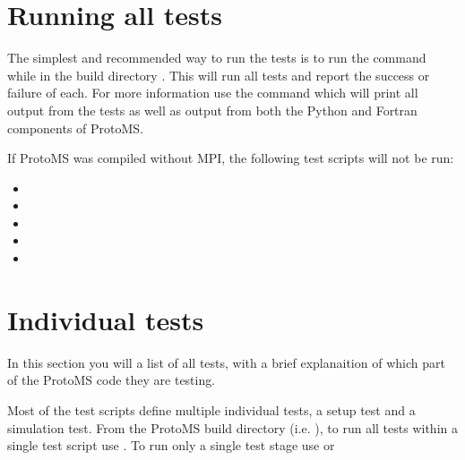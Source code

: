 \documentclass[letterpaper,10pt,english]{sphinxmanual}
\begin{document}
\section{Running all tests}
\label{\detokenize{testsuite:running-all-tests}}
The simplest and recommended way to run the tests is to run the command  while in the build directory .  This will run all tests and report the success or failure of each.  For more information use the command  which will print all output from the tests as well as output from both the Python and Fortran components of ProtoMS.

If ProtoMS was compiled without MPI, the following test scripts will not be run:
\begin{itemize}
\item {} 

\item {} 

\item {} 

\item {} 

\item {} 

\end{itemize}


\section{Individual tests}
\label{\detokenize{testsuite:individual-tests}}
In this section you will a list of all tests, with a brief explanaition of which part of the ProtoMS code they are testing.

Most of the test scripts define multiple individual tests, a setup test and a simulation test.
From the ProtoMS build directory (i.e. ), to run all tests within a single test script use .
To run only a single test stage use  or 
\end{document}
